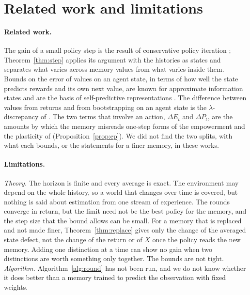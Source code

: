 \documentclass{article}
\theoremstyle{definition}
\newcommand{\dE}{\Delta E}
\newcommand{\dP}{\Delta P}
\begin{document}
\section{Related work and limitations}\label{sec:open}

\paragraph{Related work.} The gain of a small policy step is the result of conservative policy iteration \citep{kakade2002cpi}; Theorem~\ref{thm:step} applies its argument with the histories as states and separates what varies across memory values from what varies inside them. Bounds on the error of values on an agent state, in terms of how well the state predicts rewards and its own next value, are known for approximate information states \citep{subramanian2022approximate} and are the basis of self-predictive representations \citep{ni2024bridging}. The difference between values from returns and from bootstrapping on an agent state is the $\lambda$-discrepancy of \citet{allen2024lambda}. The two terms that involve an action, $\dE_t$ and $\dP_t$, are the amounts by which the memory misreads one-step forms of the empowerment and the plasticity of \citet{abel2025plasticity} (Proposition~\ref{prop:ep}). We did not find the two splits, with what each bounds, or the statements for a finer memory, in these works.

\paragraph{Limitations.} \emph{Theory.} The horizon is finite and every average is exact. The environment may depend on the whole history, so a world that changes over time is covered, but nothing is said about estimation from one stream of experience. The rounds converge in return, but the limit need not be the best policy for the memory, and the step size that the bound allows can be small. For a memory that is replaced and not made finer, Theorem~\ref{thm:replace} gives only the change of the averaged state defect, not the change of the return or of $X$ once the policy reads the new memory. Adding one distinction at a time can show no gain when two distinctions are worth something only together. The bounds are not tight. \emph{Algorithm.} Algorithm~\ref{alg:round} has not been run, and we do not know whether it does better than a memory trained to predict the observation with fixed weights.

\appendix
\end{document}
